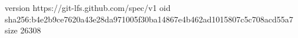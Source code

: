 version https://git-lfs.github.com/spec/v1
oid sha256:b4e2b9ce7620a43e28da971005f30ba14867e4b462ad1015807c5c708acd55a7
size 26308

